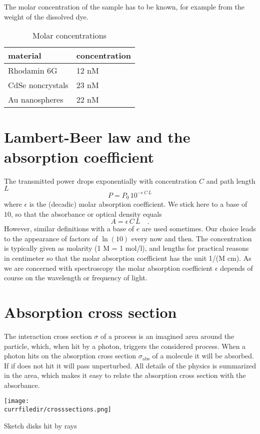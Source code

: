 The molar concentration of the sample has to be known, for example from the weight of the dissolved dye. 

\begin{table}
 \begin{tabular}{ll}
  \toprule
   material & concentration \\
   \midrule
   Rhodamin 6G &  12 nM \\
   CdSe noncrystals & 23 nM \\
   Au nanospheres & 22 nM \\
   \bottomrule
\end{tabular}   
  \caption{Molar concentrations}
\end{table}


\section{Lambert-Beer law and the absorption coefficient}

The transmitted power drops exponentially with  concentration $C$ and  path length $L$
\[
 P = P_0 \, 10^{- \epsilon\, C \, L}
\]
where $\epsilon$ is the (decadic) molar absorption coefficient. We stick here to a base of $10$, 
so that the absorbance or optical density equals 
\[
 A = \epsilon\, C \, L \quad.
\]
However, similar definitions with a base of $e$ are used sometimes. Our choice leads to the appearance of factors of $\ln(10)$ every now and then. The concentration is typically given as molarity (1 M = 1 mol/l), and lengths for practical reasons in centimeter
so that the molar absorption coefficient has the unit 1/(M  cm). As we are concerned with spectroscopy the molar absorption coefficient $\epsilon$ depends of course on the wavelength or frequency of light.

\section{Absorption cross section}


The interaction cross section $\sigma$ of a process is an imagined area around the particle, which, when hit by a photon, triggers the considered process. When a photon hits on the absorption cross section $\sigma_{\text{abs}}$ of a molecule it will be absorbed. If if does not hit it will pass unperturbed. All details of the physics is summarized in the area, which makes it easy to relate the absorption cross section with the absorbance. 
\begin{marginfigure}
\texttt{[image: \\currfiledir/crosssections.png]}
\caption{Sketch  disks hit by rays}
\end{marginfigure}


